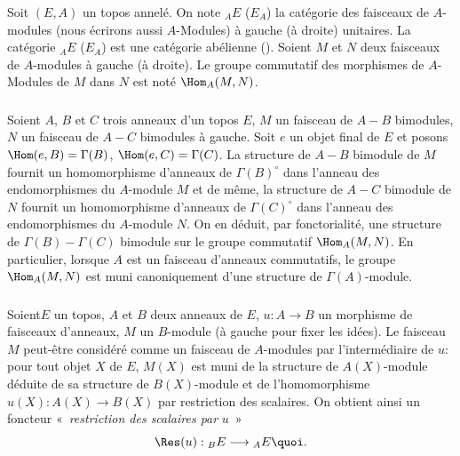 \documentclass[10pt]{../fichiers-configuration-latex/smfart}
\begin{document}
\subsubsection{}
Soit $(E,A)$ un topos annelé. On note ${}_AE$ (\resp $E_A$) la
catégorie des faisceaux de $A$-modules (nous écrirons aussi
$A$-Modules) à gauche (\resp à droite) unitaires. La catégorie
${}_AE$ (\resp $E_A$) est une catégorie abélienne
(). Soient $M$ et $N$ deux faisceaux de $A$-modules
à gauche (\resp à droite). Le groupe commutatif des morphismes de
$A$-Modules de $M$ dans $N$ est noté $\Hom_A(M,N)$.

\subsubsection{}
Soient $A$, $B$ et $C$ trois anneaux d'un topos $E$, $M$ un faisceau
de $A-B$ bimodules, $N$ un faisceau de $A-C$ bimodules à gauche.
Soit $e$ un objet final de $E$ et posons $\Hom(e,B)=\Gamma(B)$,
$\Hom(e,C)=\Gamma(C)$. La structure de $A-B$ bimodule de $M$ fournit
un homomorphisme d'anneaux de $\Gamma(B)^{\circ}$ dans l'anneau des
endomorphismes du $A$-module $M$ et de même, la structure de $A-C$
bimodule de $N$ fournit un homomorphisme d'anneaux de
$\Gamma(C)^{\circ}$ dans l'anneau des endomorphismes du $A$-module
$N$. On en déduit, par fonctorialité, une structure de
$\Gamma(B)-\Gamma(C)$ bimodule sur le groupe commutatif
$\Hom_A(M,N)$. En particulier, lorsque $A$ est un faisceau d'anneaux
commutatifs, le groupe $\Hom_A(M,N)$ est muni canoniquement d'une
structure de $\Gamma(A)$-module.

\subsubsection{}
Soient\pageoriginale $E$ un topos, $A$ et $B$ deux anneaux de $E$,
$u:A\rightarrow B$ un morphisme de faisceaux d'anneaux, $M$ un
$B$-module (à gauche pour fixer les idées). Le faisceau $M$
peut-être considéré comme un faisceau de $A$-modules par
l'intermédiaire de $u$: pour tout objet $X$ de $E$, $M(X)$ est muni
de la structure de $A(X)$-module déduite de sa structure de
$B(X)$-module et de l'homomorphisme $u(X):A(X)\rightarrow B(X)$ par
restriction des scalaires. On obtient ainsi un foncteur « \emph{restriction des scalaires par} $u$ »
$$
\Res(u):{}_BE\longrightarrow {}_AE{\quoi}.
$$
\end{document}

